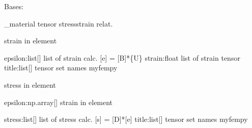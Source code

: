 \documentclass[letterpaper,10pt,english]{sphinxmanual}
\begin{document}
\begin{fulllineitems}
\label{\detokenize{myfempy.felib.materials:myfempy.felib.materials.planestress.Tensor}}
\pysigstartsignatures
{}
\pysigstopsignatures
\sphinxAtStartPar
Bases: 

\sphinxAtStartPar
\_material tensor stress\sphinxhyphen{}strain relat.

\begin{fulllineitems}
\label{\detokenize{myfempy.felib.materials:myfempy.felib.materials.planestress.Tensor.strain}}
\pysigstartsignatures
{}
\pysigstopsignatures
\sphinxAtStartPar
strain in element
\begin{description}
\sphinxAtStartPar
epsilon:list{[}{]}  \textendash{} list of strain calc. {[}e{]} = {[}B{]}*\{U\}
strain:float    \textendash{} list of strain tensor
title:list{[}{]}    \textendash{} tensor set names myfempy

\end{description}

\end{fulllineitems}


\begin{fulllineitems}
\label{\detokenize{myfempy.felib.materials:myfempy.felib.materials.planestress.Tensor.stress}}
\pysigstartsignatures
{}
\pysigstopsignatures
\sphinxAtStartPar
stress in element
\begin{description}
\sphinxAtStartPar
epsilon:np.array{[}{]} \textendash{} strain in element

\sphinxAtStartPar
stress:list{[}{]}   \textendash{} list of stress calc. {[}s{]} = {[}D{]}*{[}e{]}
title:list{[}{]}    \textendash{} tensor set names myfempy

\end{description}

\end{fulllineitems}


\end{fulllineitems}
\end{document}

